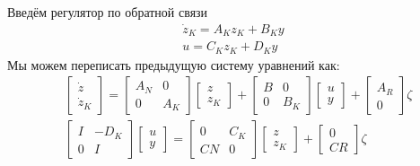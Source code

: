 Введём регулятор по обратной связи
\begin{align}
	\dot{{z}}_K = {A}_K {z}_K + {B}_K {y}\\
	{u} = {C}_K {z}_K + {D}_K {y}
\end{align}
Мы можем переписать предыдущую систему уравнений как:
\begin{align}
	&\begin{bmatrix}
		{\dot{z}} \\ {\dot{z}}_K
	\end{bmatrix}
	=
	\begin{bmatrix}
	{A}_N & 0 \\
		0 & {A}_K
	\end{bmatrix}
	\begin{bmatrix}
		{z} \\ {z}_K 
	\end{bmatrix}
	+
	\begin{bmatrix}
		{B} & 0 \\
		0 & {B}_K 
	\end{bmatrix}
	\begin{bmatrix}
		{u} \\ {y}
	\end{bmatrix}
	+
	\begin{bmatrix}
		{A}_R \\ 0 
	\end{bmatrix}
	\zeta
	\\
	& \begin{bmatrix}
		{I} & -{D}_K \\
		0 & {I}
	\end{bmatrix}
	\begin{bmatrix}
		{u} \\ {y}
	\end{bmatrix}
	=
	\begin{bmatrix}
		0 & {C}_K \\
		{C} {N} & 0
	\end{bmatrix}
	\begin{bmatrix}
		{z} \\ {z}_K
	\end{bmatrix}
	+
	\begin{bmatrix}
		0 \\ {C} {R}
	\end{bmatrix}{\zeta}
\end{align}

